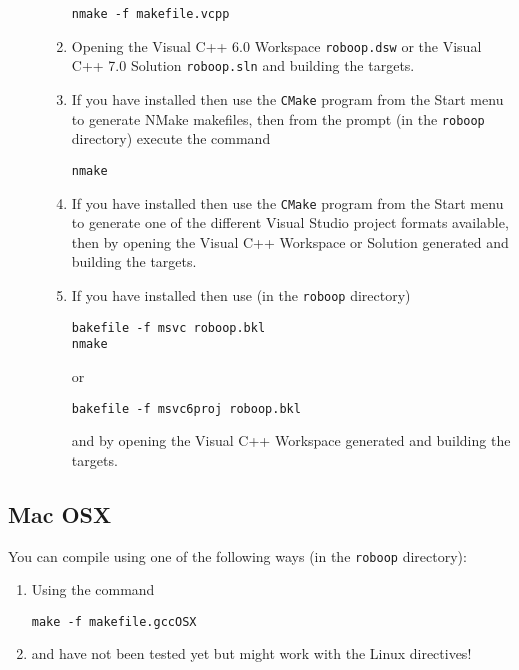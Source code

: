 \documentclass[dvips,11pt,fleqn]{report}
\begin{document}
\begin{description}
\begin{enumerate}
\begin{verbatim}
nmake -f makefile.vcpp
\end{verbatim}
  \item Opening the \textsf{Visual C++ 6.0 Workspace}
    \texttt{roboop.dsw} or the \textsf{Visual C++ 7.0 Solution}
    \texttt{roboop.sln} and building the targets.
  \item If you have
    installed then use the \texttt{CMake} program from the
    \textsf{Start} menu to generate \textsf{NMake makefiles}, then
    from the prompt (in the \texttt{roboop} directory) execute the
    command
\begin{verbatim}
nmake
\end{verbatim}
  \item If you have
    installed then use the \texttt{CMake} program from the
    \textsf{Start} menu to generate one of the different
    \textsf{Visual Studio project} formats available, then by opening
    the \textsf{Visual C++ Workspace or Solution} generated and
    building the targets.
  \item If you have
    installed then use (in the \texttt{roboop} directory)
\begin{verbatim}
bakefile -f msvc roboop.bkl
nmake
\end{verbatim}
or
\begin{verbatim}
bakefile -f msvc6proj roboop.bkl
\end{verbatim}
and by opening the \textsf{Visual C++ Workspace} generated and
building the targets.
  \end{enumerate}
\end{description}

\subsection{Mac OSX}

You can compile using one of the following ways (in the
\texttt{roboop} directory):
\begin{enumerate}
\item Using the command 
\begin{verbatim}
make -f makefile.gccOSX
\end{verbatim}
\item {} and
  have not been tested yet but might work with the \textsf{Linux}
  directives!
\end{enumerate}
\end{document}
